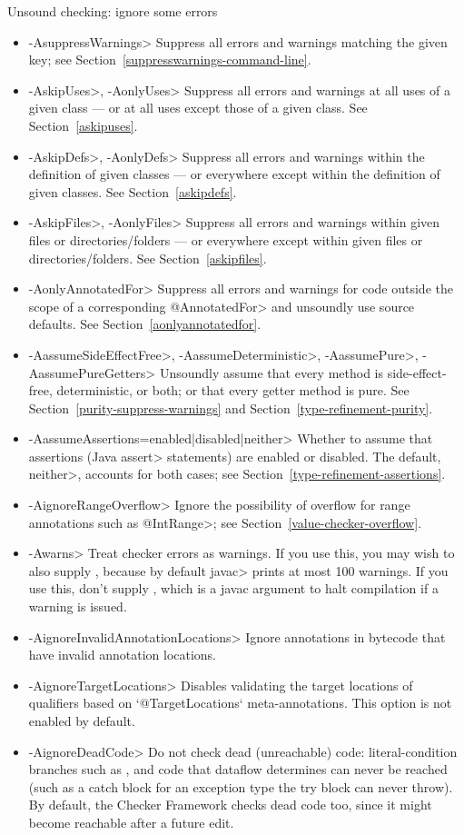Unsound checking: ignore some errors
\begin{itemize}
\item \<-AsuppressWarnings>
  Suppress all errors and warnings matching the given key; see
  Section~\ref{suppresswarnings-command-line}.
\item \<-AskipUses>, \<-AonlyUses>
  Suppress all errors and warnings at all uses of a given class --- or at all
  uses except those of a given class.  See Section~\ref{askipuses}.
\item \<-AskipDefs>, \<-AonlyDefs>
  Suppress all errors and warnings within the definition of given classes
  --- or everywhere except within the definition of given classes.  See
  Section~\ref{askipdefs}.
\item \<-AskipFiles>, \<-AonlyFiles>
  Suppress all errors and warnings within given files or directories/folders
  --- or everywhere except within given files or directories/folders.  See
  Section~\ref{askipfiles}.
\item \<-AonlyAnnotatedFor>
  Suppress all errors and warnings for code outside the scope of a corresponding \<@AnnotatedFor> and
  unsoundly use source defaults.
  See Section~\ref{aonlyannotatedfor}.
\item \<-AassumeSideEffectFree>, \<-AassumeDeterministic>, \<-AassumePure>, \<-AassumePureGetters>
  Unsoundly assume that every method is side-effect-free, deterministic, or
  both; or that every getter method is pure.
  See Section~\ref{purity-suppress-warnings} and
  Section~\ref{type-refinement-purity}.
\item \<-AassumeAssertions=enabled|disabled|neither>
  Whether to assume that assertions (Java \<assert> statements) are enabled
  or disabled.  The default, \<neither>, accounts for both cases; see
  Section~\ref{type-refinement-assertions}.
\item \<-AignoreRangeOverflow>
  Ignore the possibility of overflow for range annotations such as
  \<@IntRange>; see Section~\ref{value-checker-overflow}.
\item \<-Awarns>
  Treat checker errors as warnings.  If you use this, you may wish to also
  supply , because by default \<javac> prints at
  most 100 warnings.  If you use this, don't supply ,
  which is a javac argument to halt compilation if a warning is issued.
\item \<-AignoreInvalidAnnotationLocations>
  Ignore annotations in bytecode that have invalid annotation locations.
\item \<-AignoreTargetLocations>
  Disables validating the target locations of qualifiers based on
  `@TargetLocations` meta-annotations. This option is not enabled by default.
\item \<-AignoreDeadCode>
  Do not check dead (unreachable) code: literal-condition branches such as
  , and code that dataflow determines can never be reached
  (such as a catch block for an exception type the try block can never
  throw). By default, the Checker Framework checks dead code too, since it
  might become reachable after a future edit.
\end{itemize}

